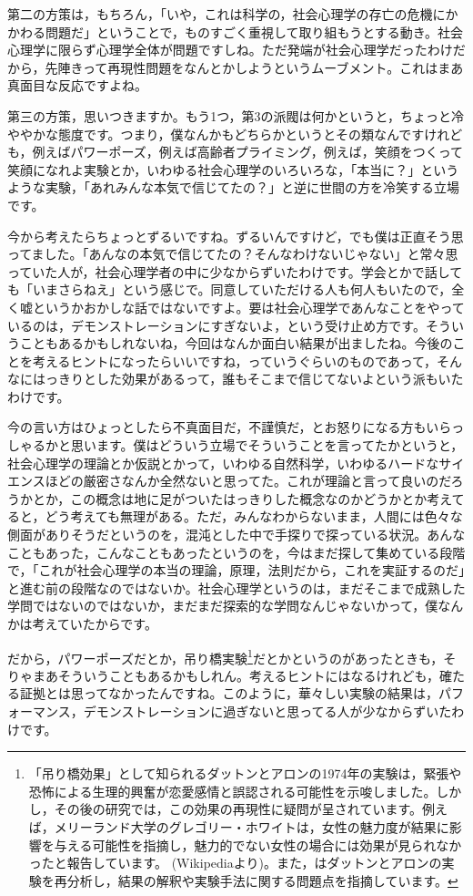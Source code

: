 \documentclass{ltjsbook}
\begin{document}
第二の方策は，もちろん，「いや，これは科学の，社会心理学の存亡の危機にかかわる問題だ」ということで，ものすごく重視して取り組もうとする動き。社会心理学に限らず心理学全体が問題ですしね。ただ発端が社会心理学だったわけだから，先陣きって再現性問題をなんとかしようというムーブメント。これはまあ真面目な反応ですよね。

第三の方策，思いつきますか。もう1つ，第3の派閥は何かというと，ちょっと冷ややかな態度です。つまり，僕なんかもどちらかというとその類なんですけれども，例えばパワーポーズ，例えば高齢者プライミング，例えば，笑顔をつくって笑顔になれよ実験とか，いわゆる社会心理学のいろいろな，「本当に？」というような実験，「あれみんな本気で信じてたの？」と逆に世間の方を冷笑する立場です。

今から考えたらちょっとずるいですね。ずるいんですけど，でも僕は正直そう思ってました。「あんなの本気で信じてたの？そんなわけないじゃない」と常々思っていた人が，社会心理学者の中に少なからずいたわけです。学会とかで話しても「いまさらねえ」という感じで。同意していただける人も何人もいたので，全く嘘というかおかしな話ではないですよ。要は社会心理学であんなことをやっているのは，デモンストレーションにすぎないよ，という受け止め方です。そういうこともあるかもしれないね，今回はなんか面白い結果が出ましたね。今後のことを考えるヒントになったらいいですね，っていうぐらいのものであって，そんなにはっきりとした効果があるって，誰もそこまで信じてないよという派もいたわけです。

今の言い方はひょっとしたら不真面目だ，不謹慎だ，とお怒りになる方もいらっしゃるかと思います。僕はどういう立場でそういうことを言ってたかというと，社会心理学の理論とか仮説とかって，いわゆる自然科学，いわゆるハードなサイエンスほどの厳密さなんか全然ないと思ってた。これが理論と言って良いのだろうかとか，この概念は地に足がついたはっきりした概念なのかどうかとか考えてると，どう考えても無理がある。ただ，みんなわからないまま，人間には色々な側面がありそうだというのを，混沌とした中で手探りで探っている状況。あんなこともあった，こんなこともあったというのを，今はまだ探して集めている段階で，「これが社会心理学の本当の理論，原理，法則だから，これを実証するのだ」と進む前の段階なのではないか。社会心理学というのは，まだそこまで成熟した学問ではないのではないか，まだまだ探索的な学問なんじゃないかって，僕なんかは考えていたからです。

だから，パワーポーズだとか，吊り橋実験\footnote{「吊り橋効果」として知られるダットンとアロンの1974年の実験は，緊張や恐怖による生理的興奮が恋愛感情と誤認される可能性を示唆しました。しかし，その後の研究では，この効果の再現性に疑問が呈されています。例えば，メリーランド大学のグレゴリー・ホワイトは，女性の魅力度が結果に影響を与える可能性を指摘し，魅力的でない女性の場合には効果が見られなかったと報告しています。 (Wikipediaより)。また，\textcite{Saito_DA}はダットンとアロンの実験を再分析し，結果の解釈や実験手法に関する問題点を指摘しています。 }だとかというのがあったときも，そりゃまあそういうこともあるかもしれん。考えるヒントにはなるけれども，確たる証拠とは思ってなかったんですね。このように，華々しい実験の結果は，パフォーマンス，デモンストレーションに過ぎないと思ってる人が少なからずいたわけです。
\end{document}
